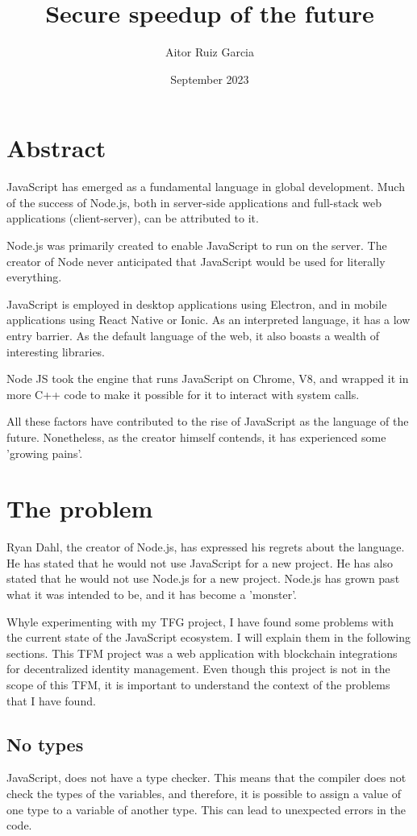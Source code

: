 \documentclass[12pt, letterpaper]{article}
\title{Secure speedup of the future}
\author{Aitor Ruiz Garcia}
\date{September 2023}
\begin{document}
\maketitle
\begin{multicols}{2}
    \section{Abstract}
    JavaScript has emerged as a fundamental language in global development. Much of the success of Node.js, both in server-side applications and full-stack web applications (client-server), can be attributed to it.

    Node.js was primarily created to enable JavaScript to run on the server. The creator of Node never anticipated that JavaScript would be used for literally everything.

    JavaScript is employed in desktop applications using Electron, and in mobile applications using React Native or Ionic. As an interpreted language, it has a low entry barrier. As the default language of the web, it also boasts a wealth of interesting libraries.

    Node JS took the engine that runs JavaScript on Chrome, V8, and wrapped it in more C++ code to make it possible for it to interact with system calls.

    All these factors have contributed to the rise of JavaScript as the language of the future. Nonetheless, as the creator himself contends, it has experienced some 'growing pains'.
    \section{The problem}

    Ryan Dahl, the creator of Node.js, has expressed his regrets about the language. He has stated that he would not use JavaScript for a new project. He has also stated that he would not use Node.js for a new project. Node.js has grown past what it was intended to be, and it has become a 'monster'.

    Whyle experimenting with my TFG project, I have found some problems with the current state of the JavaScript ecosystem. I will explain them in the following sections. This TFM project was a web application with blockchain integrations for decentralized identity management. Even though this project is not in the scope of this TFM, it is important to understand the context of the problems that I have found.

    \subsection{No types}
    JavaScript, does not have a type checker. This means that the compiler does not check the types of the variables, and therefore, it is possible to assign a value of one type to a variable of another type. This can lead to unexpected errors in the code.


\end{multicols}
\end{document}
